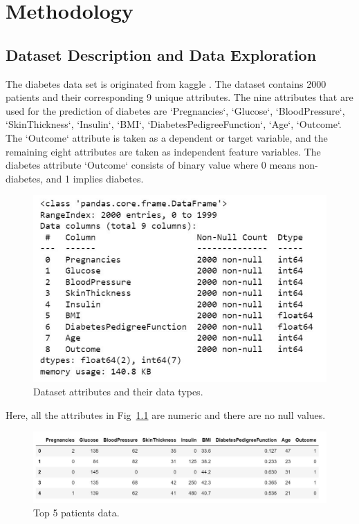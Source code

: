 \chapter{Methodology}
\label{ch:method} %
\section{Dataset Description and Data Exploration}
The diabetes data set is originated from kaggle \citep{dataset}. The dataset contains 2000 patients and their corresponding 9 unique attributes. The nine attributes that are used for the prediction of diabetes are `Pregnancies`, 
`Glucose`, `BloodPressure`, `SkinThickness`, `Insulin`, `BMI`, `DiabetesPedigreeFunction`, `Age`, `Outcome`. The `Outcome` attribute is taken as a dependent or target variable, and the remaining eight attributes are taken as independent feature variables. The diabetes attribute `Outcome` consists of binary value where 0 means non-diabetes, and 1 implies diabetes.

\begin{figure}[ht]
    \centering    \includegraphics[scale=1.0]{figures/data_info.pdf}
    \caption{Dataset attributes and their data types.}
    \label{fig:capture_a}
\end{figure}
Here, all the attributes in Fig~\ref{fig:capture_a} are numeric and there are no null values. 
\begin{figure}[ht]
    \centering    \includegraphics[scale=0.8]{figures/data_top5.pdf}
    \caption{Top 5 patients data.}
    \label{fig:capture_b}
\end{figure}


